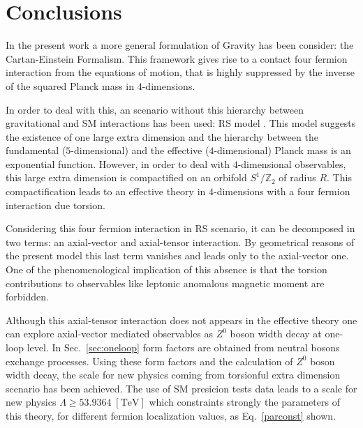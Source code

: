 \section{Conclusions}
\label{sec:conclusions}

In the present work a more general formulation of Gravity has been consider: the Cartan-Einstein Formalism. This framework gives rise to a contact four fermion interaction from the equations of motion, that is highly suppressed by the inverse of the squared Planck mass in $4$-dimensions. 

In order to deal with this, an scenario without this hierarchy between gravitational and SM interactions has been used: RS model \cite{Randall:1999ee}. This model suggests the existence of one large extra dimension and the hierarchy between the fundamental ($5$-dimensional) and the effective ($4$-dimensional) Planck mass is an exponential function. However, in order to deal with $4$-dimensional observables, this large extra dimension is compactified on an orbifold $S^1/\mathbb{Z}_2$ of radius $R$. This compactification leads to an effective theory in $4$-dimensions with a four fermion interaction due torsion. 

Considering this four fermion interaction in RS scenario, it can be decomposed in two terms: an axial-vector and axial-tensor interaction. By geometrical reasons of the present model this last term vanishes and leads only to the axial-vector one. One of the phenomenological implication of this absence is that the torsion contributions to observables like leptonic anomalous magnetic moment are forbidden. 

Although this axial-tensor interaction does not appears in the effective theory one can explore axial-vector mediated observables as $Z^0$ boson width decay at one-loop level. In Sec.~\ref{sec:oneloop} form factors are obtained from neutral bosons exchange processes. Using these form factors and the calculation of $Z^0$ boson width decay, the scale for new physics coming from torsionful extra dimension scenario has been achieved. The use of SM presicion tests data leads to a scale for new physics $ \Lambda \geq 53.9364\;[\text{TeV}]$ which constraints strongly the parameters of this theory, for different fermion localization values, as Eq.~\eqref{parconst} shown.